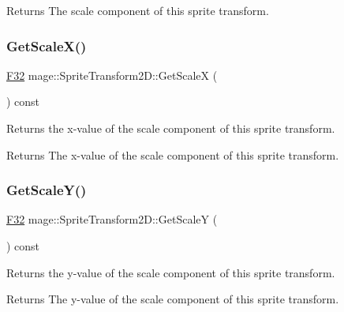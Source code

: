 \begin{DoxyReturn}{Returns}
The scale component of this sprite transform. 
\end{DoxyReturn}
\mbox{\label{classmage_1_1_sprite_transform2_d_a1c9dc98fb06dd807a0a8741c905323c6}} 
\subsubsection{\texorpdfstring{Get\+Scale\+X()}{GetScaleX()}}
{\footnotesize\ttfamily \mbox{\hyperlink{namespacemage_aa97e833b45f06d60a0a9c4fc22ae02c0}{F32}} mage\+::\+Sprite\+Transform2\+D\+::\+Get\+ScaleX (\begin{DoxyParamCaption}{ }\end{DoxyParamCaption}) const\hspace{0.3cm}{\ttfamily [noexcept]}}

Returns the x-\/value of the scale component of this sprite transform.

\begin{DoxyReturn}{Returns}
The x-\/value of the scale component of this sprite transform. 
\end{DoxyReturn}
\mbox{\label{classmage_1_1_sprite_transform2_d_a84425c2f3fa1ce2da55e268930b5efab}} 
\subsubsection{\texorpdfstring{Get\+Scale\+Y()}{GetScaleY()}}
{\footnotesize\ttfamily \mbox{\hyperlink{namespacemage_aa97e833b45f06d60a0a9c4fc22ae02c0}{F32}} mage\+::\+Sprite\+Transform2\+D\+::\+Get\+ScaleY (\begin{DoxyParamCaption}{ }\end{DoxyParamCaption}) const\hspace{0.3cm}{\ttfamily [noexcept]}}

Returns the y-\/value of the scale component of this sprite transform.

\begin{DoxyReturn}{Returns}
The y-\/value of the scale component of this sprite transform. 
\end{DoxyReturn}
\mbox{\label{classmage_1_1_sprite_transform2_d_a49a6de2c58c72bb52d53feb5c66332c1}} 
